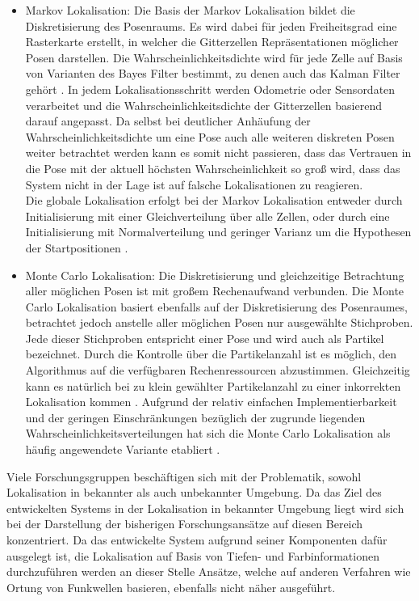 \begin{itemize}
\item Markov Lokalisation: Die Basis der Markov Lokalisation bildet die Diskretisierung des Posenraums. Es wird dabei für jeden Freiheitsgrad eine Rasterkarte erstellt, in welcher die Gitterzellen Repräsentationen möglicher Posen darstellen. Die Wahrscheinlichkeitsdichte wird für jede Zelle auf Basis von Varianten des Bayes Filter bestimmt, zu denen auch das Kalman Filter gehört \cite{Hertzberg2012}. In jedem Lokalisationsschritt werden Odometrie oder Sensordaten verarbeitet und die Wahrscheinlichkeitsdichte der Gitterzellen basierend darauf angepasst. Da selbst bei deutlicher Anhäufung der Wahrscheinlichkeitsdichte um eine Pose auch alle weiteren diskreten Posen weiter betrachtet werden kann es somit nicht passieren, dass das Vertrauen in die Pose mit der aktuell höchsten Wahrscheinlichkeit so groß wird, dass das System nicht in der Lage ist auf falsche Lokalisationen zu reagieren.\\
Die globale Lokalisation erfolgt bei der Markov Lokalisation entweder durch Initialisierung mit einer Gleichverteilung über alle Zellen, oder durch eine Initialisierung mit Normalverteilung und geringer Varianz um die Hypothesen der Startpositionen \cite{Hertzberg2012}.\\

\item Monte Carlo Lokalisation: Die Diskretisierung und gleichzeitige Betrachtung aller möglichen Posen ist mit großem Rechenaufwand verbunden. Die Monte Carlo Lokalisation basiert ebenfalls auf der Diskretisierung des Posenraumes, betrachtet jedoch anstelle aller möglichen Posen nur ausgewählte Stichproben. Jede dieser Stichproben entspricht einer Pose und wird auch als Partikel bezeichnet. Durch die Kontrolle über die Partikelanzahl ist es möglich, den Algorithmus auf die verfügbaren Rechenressourcen abzustimmen. Gleichzeitig kann es natürlich bei zu klein gewählter Partikelanzahl zu einer inkorrekten Lokalisation kommen \cite{Thrun2001}. Aufgrund der relativ einfachen Implementierbarkeit und der geringen Einschränkungen bezüglich der zugrunde liegenden Wahrscheinlichkeitsverteilungen hat sich die Monte Carlo Lokalisation als häufig angewendete Variante etabliert \cite{Thrun2005}.
\end{itemize}

Viele Forschungsgruppen beschäftigen sich mit der Problematik, sowohl Lokalisation in bekannter als auch unbekannter Umgebung.
Da das Ziel des entwickelten Systems in der Lokalisation in bekannter Umgebung liegt wird sich bei der Darstellung der bisherigen Forschungsansätze auf diesen Bereich konzentriert. Da das entwickelte System aufgrund seiner Komponenten dafür ausgelegt ist, die Lokalisation auf Basis von Tiefen- und Farbinformationen durchzuführen werden an dieser Stelle Ansätze, welche auf anderen Verfahren wie Ortung von Funkwellen basieren, ebenfalls nicht näher ausgeführt.\\

